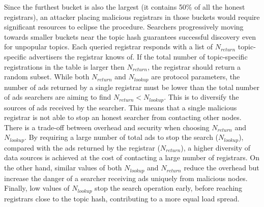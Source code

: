 Since the furthest bucket is also the largest (\ie it contains 50\% of all the honest registrars), an attacker placing malicious registrars in those buckets would require significant resources to eclipse the procedure. 
Searchers progressively moving towards smaller buckets near the topic hash guarantees successful discovery even for unpopular topics.
Each queried registrar responds with a list of $N_\textit{return}$ topic-specific advertisers the registrar knows of. 
If the total number of topic-specific registrations in the table is larger then
$N_\textit{return}$, the registrar should return a random subset.
While both $N_\textit{return}$ and $N_\textit{lookup}$ are protocol parameters,
the number of ads returned by a single registrar must be lower than the total
number of ads searchers are aiming to find $N_\textit{return} <
N_\textit{lookup}$. This is to diversify the sources of ads received by the searcher. This means that a single malicious registrar is not able to stop an honest searcher from contacting other nodes.
There is a trade-off between overhead and security when choosing $N_\textit{return}$ and $N_\textit{lookup}$. 
By requiring a large number of total ads to stop the search
($N_\textit{lookup}$), compared with the ads returned by the registrar
($N_\textit{return}$), a higher diversity of data sources is achieved at the cost of contacting a large number of registrars. On the other hand, similar values of both $N_\textit{lookup}$ and $N_\textit{return}$ reduce the overhead but increase the danger of a searcher receiving ads uniquely from malicious nodes. Finally, low values of $N_\textit{lookup}$ stop the search operation early, before reaching registrars close to the topic hash, contributing to a more equal load spread.


